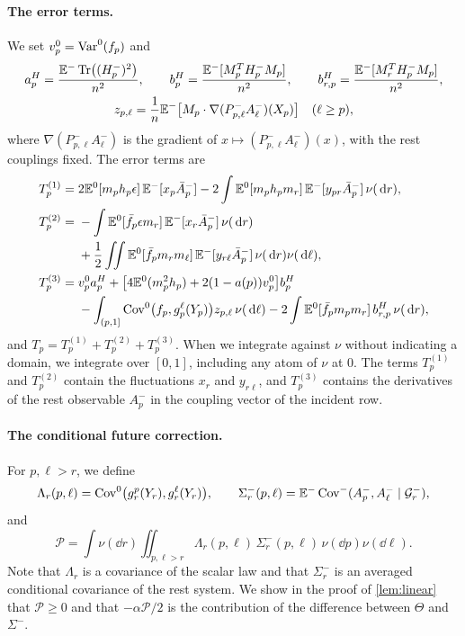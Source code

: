 \paragraph{The error terms.}
We set $v_p^0=\operatorname{Var}^0(f_p)$ and
\begin{gather*}
 a_p^H=\frac{\mathbb E^-\operatorname{Tr}\bigl((H_p^-)^2\bigr)}{n^2},\qquad
 b_p^H=\frac{\mathbb E^-[M_p^TH_p^-M_p]}{n^2},\qquad
 b_{r,p}^H=\frac{\mathbb E^-[M_r^TH_p^-M_p]}{n^2},\\
 z_{p,\ell}=\frac1n\mathbb E^-\bigl[M_p\cdot\nabla(P^-_{p,\ell}A_\ell^-)(X_p)\bigr]
 \quad(\ell\ge p),
\end{gather*}
where $\nabla(P^-_{p,\ell}A_\ell^-)$ is the gradient of
$x\mapsto(P^-_{p,\ell}A_\ell^-)(x)$, with the rest couplings fixed. The
error terms are
\begin{align}
 T_p^{(1)}={}&2\mathbb E^0[m_ph_p\epsilon]\,\mathbb E^-[x_p\bar A_p^-]
 -2\int\mathbb E^0[m_ph_pm_r]\,\mathbb E^-[y_{pr}\bar A_p^-]\,\nu(\,\mathrm d r),
 \label{eq:cav-T1}\\
 T_p^{(2)}={}&-\int\mathbb E^0[\bar f_p\epsilon m_r]\,
                         \mathbb E^-[x_r\bar A_p^-]\,\nu(\,\mathrm d r)\nonumber\\
 &+\frac12\iint\mathbb E^0[\bar f_pm_rm_\ell]\,
                  \mathbb E^-[y_{r\ell}\bar A_p^-]\,\nu(\,\mathrm d r)\nu(\,\mathrm d\ell),
 \label{eq:cav-T2}\\
 T_p^{(3)}={}&v_p^0a_p^H+
       \bigl[4\mathbb E^0(m_p^2h_p)+2(1-a(p))v_p^0\bigr]b_p^H\nonumber\\
 &-\int_{(p,1]}\operatorname{Cov}^0\bigl(f_p,g_p^\ell(Y_p)\bigr)z_{p,\ell}\,\nu(\,\mathrm d\ell)
 -2\int\mathbb E^0[\bar f_pm_pm_r]\,b_{r,p}^H\,\nu(\,\mathrm d r),
 \label{eq:cav-T3}
\end{align}
and $T_p=T_p^{(1)}+T_p^{(2)}+T_p^{(3)}$. When we integrate against
$\nu$ without indicating a domain, we integrate over $[0,1]$, including
any atom of $\nu$ at $0$.
The terms $T_p^{(1)}$ and $T_p^{(2)}$ contain the fluctuations
$x_r$ and $y_{r\ell}$, and $T_p^{(3)}$ contains the derivatives of the
rest observable $A_p^-$ in the coupling vector of the incident row.

\paragraph{The conditional future correction.}
For $p,\ell>r$, we define
\[
 \Lambda_r(p,\ell)=\operatorname{Cov}^0\bigl(g_r^p(Y_r),g_r^\ell(Y_r)\bigr),\qquad
 \Sigma_r^-(p,\ell)=\mathbb E^-\operatorname{Cov}^-(A_p^-,A_\ell^-\mid\mathcal G_r^-),
\]
and
\begin{equation}\label{eq:Ppositive}
 \mathcal P=\int\nu(\dd r)\iint_{p,\ell>r}
      \Lambda_r(p,\ell)\,\Sigma_r^-(p,\ell)\,\nu(\dd p)\nu(\dd\ell).
\end{equation}
Note that $\Lambda_r$ is a covariance of the scalar law and that
$\Sigma_r^-$ is an averaged conditional covariance of the rest system.
We show in the proof of \cref{lem:linear} that $\mathcal P\ge0$ and
that $-\alpha\mathcal P/2$ is the contribution of the difference
between $\Theta$ and $\Sigma^-$.

